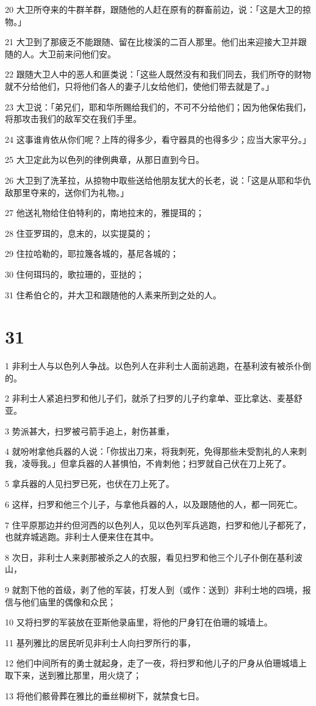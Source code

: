 \par 20 大卫所夺来的牛群羊群，跟随他的人赶在原有的群畜前边，说：「这是大卫的掠物。」
\par 21 大卫到了那疲乏不能跟随、留在比梭溪的二百人那里。他们出来迎接大卫并跟随的人。大卫前来问他们安。
\par 22 跟随大卫人中的恶人和匪类说：「这些人既然没有和我们同去，我们所夺的财物就不分给他们，只将他们各人的妻子儿女给他们，使他们带去就是了。」
\par 23 大卫说：「弟兄们，耶和华所赐给我们的，不可不分给他们；因为他保佑我们，将那攻击我们的敌军交在我们手里。
\par 24 这事谁肯依从你们呢？上阵的得多少，看守器具的也得多少；应当大家平分。」
\par 25 大卫定此为以色列的律例典章，从那日直到今日。
\par 26 大卫到了洗革拉，从掠物中取些送给他朋友犹大的长老，说：「这是从耶和华仇敌那里夺来的，送你们为礼物。」
\par 27 他送礼物给住伯特利的，南地拉末的，雅提珥的；
\par 28 住亚罗珥的，息末的，以实提莫的；
\par 29 住拉哈勒的，耶拉篾各城的，基尼各城的；
\par 30 住何珥玛的，歌拉珊的，亚挞的；
\par 31 住希伯仑的，并大卫和跟随他的人素来所到之处的人。

\chapter{31}

\par 1 非利士人与以色列人争战。以色列人在非利士人面前逃跑，在基利波有被杀仆倒的。
\par 2 非利士人紧追扫罗和他儿子们，就杀了扫罗的儿子约拿单、亚比拿达、麦基舒亚。
\par 3 势派甚大，扫罗被弓箭手追上，射伤甚重，
\par 4 就吩咐拿他兵器的人说：「你拔出刀来，将我刺死，免得那些未受割礼的人来刺我，凌辱我。」但拿兵器的人甚惧怕，不肯刺他；扫罗就自己伏在刀上死了。
\par 5 拿兵器的人见扫罗已死，也伏在刀上死了。
\par 6 这样，扫罗和他三个儿子，与拿他兵器的人，以及跟随他的人，都一同死亡。
\par 7 住平原那边并约但河西的以色列人，见以色列军兵逃跑，扫罗和他儿子都死了，也就弃城逃跑。非利士人便来住在其中。
\par 8 次日，非利士人来剥那被杀之人的衣服，看见扫罗和他三个儿子仆倒在基利波山，
\par 9 就割下他的首级，剥了他的军装，打发人到（或作：送到）非利士地的四境，报信与他们庙里的偶像和众民；
\par 10 又将扫罗的军装放在亚斯他录庙里，将他的尸身钉在伯珊的城墙上。
\par 11 基列雅比的居民听见非利士人向扫罗所行的事，
\par 12 他们中间所有的勇士就起身，走了一夜，将扫罗和他儿子的尸身从伯珊城墙上取下来，送到雅比那里，用火烧了；
\par 13 将他们骸骨葬在雅比的垂丝柳树下，就禁食七日。



